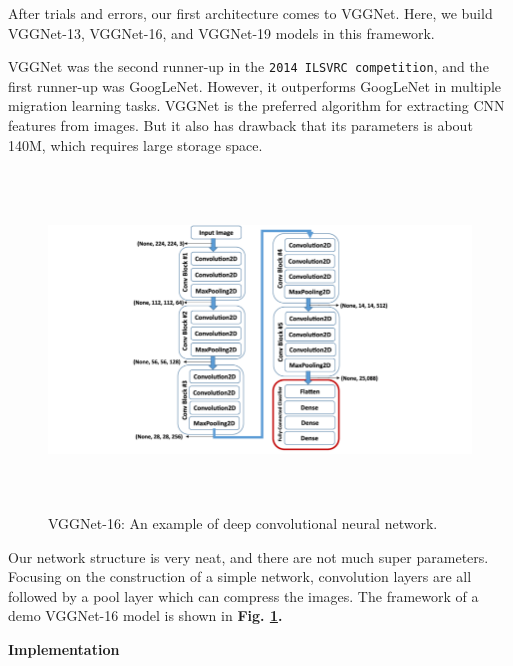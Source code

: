 \documentclass[a4paper]{article}
\begin{document}
\large{
After trials and errors, our first architecture comes to \textsf{VGGNet}. Here, we build \textsf{VGGNet-13}, \textsf{VGGNet-16}, and \textsf{VGGNet-19} models in this framework.

\textsf{VGGNet} was the second runner-up in the \texttt{2014 ILSVRC competition}, and the first runner-up was \textsf{GoogLeNet}. However, it outperforms \textsf{GoogLeNet} in multiple migration learning tasks. \textsf{VGGNet} is the preferred algorithm for extracting CNN features from images. But it also has drawback that its parameters is about 140M, which requires large storage space.

\begin{figure}[h]
\centering
\includegraphics[width=15cm,height=9cm]{A-schematic-of-the-VGG-16-Deep-Convolutional-Neural-Network-DCNN-architecture-trained.png}
\caption{\textsf{VGGNet-16}: An example of deep convolutional neural network.}
\label{vgg16}
\end{figure}

Our network structure is very neat, and there are not much super parameters. Focusing on the construction of a simple network, convolution layers are all followed by a pool layer which can compress the images. The framework of a demo \textsf{VGGNet-16} model is shown in \textbf{Fig. \ref{vgg16}.} 

}

\vspace{2mm}
\begin{center}
\large\textbf{Implementation} \\
\end{center}
\end{document}
